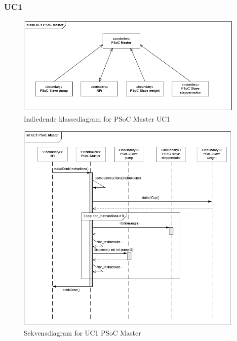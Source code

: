 \subsubsection{UC1}

\begin{figure}[H]
	\centering
	\includegraphics[width=1\textwidth]{Images/Applikationsmodeller/PSoCMaster/UC1_cd_PSoC_Master.png}
	\caption{Indledende klassediagram for PSoC Master UC1}
	\label{fig:cdUC1PSoCMaster}
\end{figure}

\begin{figure}[H]
	\centering
	\includegraphics[width=1\textwidth]{Images/Applikationsmodeller/PSoCMaster/UC1_sd_PSoC_Master.png}
	\caption{Sekvensdiagram for UC1 PSoC Master}
	\label{fig:sdUC1PSoCMaster}
\end{figure}

